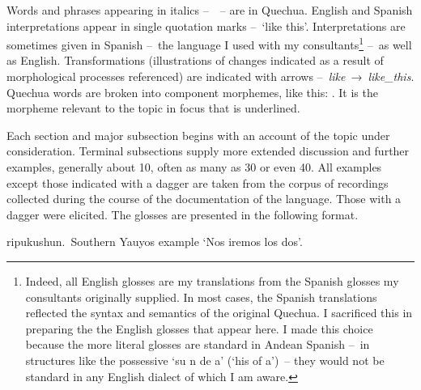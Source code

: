 Words and phrases appearing in italics --~~-- are in Quechua. English and Spanish interpretations appear in single quotation marks --~‘like this’. Interpretations are sometimes given in Spanish --~the language I used with my consultants\footnote{Indeed, all English glosses are my translations from the Spanish glosses my consultants originally supplied. In most cases, the Spanish translations reflected the syntax and semantics of the original Quechua. I sacrificed this in preparing the the English glosses that appear here. I made this choice because the more literal glosses are standard in Andean Spanish --~in structures like the possessive ‘su n de a’ (‘his  of a’)~-- they would not be standard in any English dialect of which I am aware.} --~as well as English. Transformations (illustrations of changes indicated as a result of morphological processes referenced) are indicated with arrows --~\textit{like}~→~\textit{like\_this}. Quechua words are broken into component morphemes, like this: . It is the morpheme relevant to the topic in focus that is underlined. 

Each section and major subsection begins with an account of the topic under consideration. Terminal subsections supply more extended discussion and further examples, generally about 10, often as many as 30 or even 40. All examples except those indicated with a dagger are taken from the corpus of recordings collected during the course of the documentation of the language. Those with a dagger were elicited. The glosses are presented in the following format.\\[1ex]

\begin{footnotesize}
\gloexe{}{}{}%
{ ripukushun.~\textup{\AMV}\hspace{29.5ex}Southern Yauyos example}%
{\hspace{23ex}}%
%
{‘Nos iremos los dos’.}%
{}{}%
\end{footnotesize}

 



